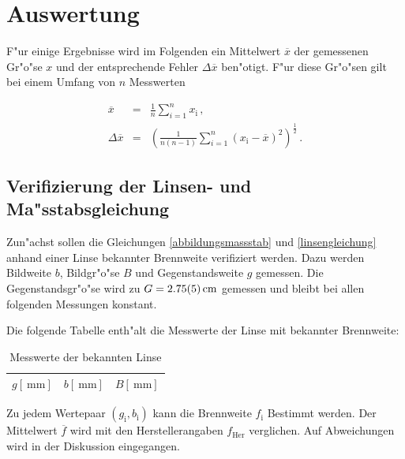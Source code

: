 \section{Auswertung}
	\label{sec:auswertung}

	F"ur einige Ergebnisse wird im Folgenden ein Mittelwert $\overline{x}$ der gemessenen Gr"o"se $x$ und der entsprechende Fehler $\Delta \overline{x}$ ben"otigt.
	F"ur diese Gr"o"sen gilt bei einem Umfang von $n$ Messwerten

	\begin{eqnarray*}
		\overline{x} & = & \frac{1}{n} \sum_{i=1}^{n}{x_\mathrm{i}} \, , \\
		\Delta \overline{x} & = & \left(\frac{1}{n (n-1)} \sum_{i = 1}^{n}{{\left(x_\mathrm{i} - \overline{x}\right)}^2}\right)^\frac{1}{2} \, .
	\end{eqnarray*}

	\subsection{Verifizierung der Linsen- und Ma"sstabsgleichung}
		\label{subsec:verifizierung}
		Zun"achst sollen die Gleichungen \eqref{abbildungsmassstab} und \eqref{linsengleichung} anhand einer Linse bekannter Brennweite verifiziert werden.
		Dazu werden Bildweite $b$, Bildgr"o"se $B$ und Gegenstandsweite $g$ gemessen.
		Die Gegenstandsgr"o"se wird zu $G = \SI{2.75 (5)}{\centi \meter}$ gemessen und bleibt bei allen folgenden Messungen konstant.

		Die folgende Tabelle enth"alt die Messwerte der Linse mit bekannter Brennweite:

		\begin{table}[!h]
			\begin{center}
				\label{tabelle:bekannt}
				\caption{Messwerte der bekannten Linse}
				\begin{tabular}{|c|c|c|}
					\hline 
					$g [\SI{}{\milli \meter}]$ & $b [\SI{}{\milli \meter}]$ & $B [\SI{}{\milli \meter}]$ \\
					\hline 
					\hline
					
					\hline 
				\end{tabular}
			\end{center}
		\end{table}

		Zu jedem Wertepaar $(g_\mathrm{i}, b_\mathrm{i})$ kann die Brennweite $f_\mathrm{i}$ Bestimmt werden.
		Der Mittelwert $\overline{f}$ wird mit den Herstellerangaben $f_\mathrm{Her}$ verglichen.
		Auf Abweichungen wird in der Diskussion eingegangen.

